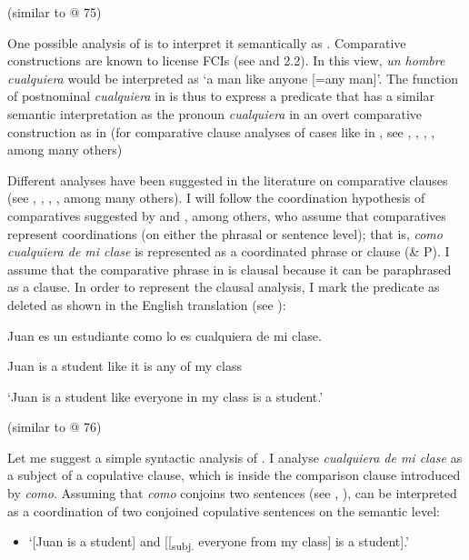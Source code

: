  (similar to @ 75)

  One possible analysis of  is to interpret it semantically as . Comparative constructions are known to license FCIs (see \citealt{Aloni2021} and 2.2). In this view, \textit{un hombre cualquiera} would be interpreted as ‘a man like anyone [=any man]’. The function of postnominal \textit{cualquiera} in  is thus to express a predicate that has a similar semantic interpretation as the pronoun \textit{cualquiera} in an overt comparative construction as in  (for comparative clause analyses of cases like in , see \citealt{Bresnan1973}, \citealt{NesporNapoli1986}, \citealt{Sáez1992}, \citealt{Kennedy1999}, among many others)

  Different analyses have been suggested in the literature on comparative clauses (see \citealt{Bresnan1973}, \citealt{NesporNapoli1986}, \citealt{Sáez1992}, \citealt{Kennedy1999}, among many others). I will follow the coordination hypothesis of comparatives suggested by \citet{NesporNapoli1986} and \citet{Sáez1992}, among others, who assume that comparatives represent coordinations (on either the phrasal or sentence level); that is, \textit{como cualquiera de mi clase} is represented as a coordinated phrase or clause (\& P). I assume that the comparative phrase in  is clausal because it can be paraphrased as a clause. In order to represent the clausal analysis, I mark the predicate as deleted as shown in the English translation (see \citealt{Bresnan1973}):

\label{bkm:Ref72354047}  Juan es un estudiante como lo es cualquiera de mi clase.

  Juan is a student like it is any of my class

  ‘Juan is a student like everyone in my class is a student.’

  (similar to @ 76)

Let me suggest a simple syntactic analysis of . I analyse \textit{cualquiera de mi clase} as a subject of a copulative clause, which is inside the comparison clause introduced by \textit{como}. Assuming that \textit{como} conjoins two sentences (see \citealt{NesporNapoli1986}, \citealt{Sáez1992}),  can be interpreted as a coordination of two conjoined copulative sentences on the semantic level:

\begin{itemize}
\item ‘[Juan is a student] and [[\textsubscript{subj.} everyone from my class] is a student].’
\end{itemize}

